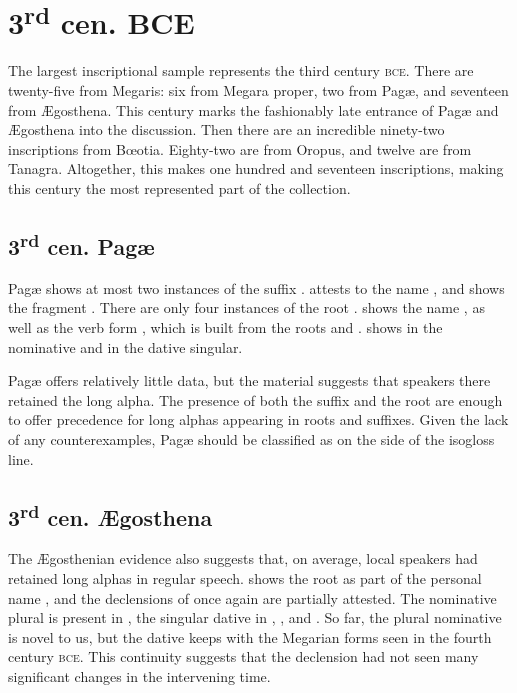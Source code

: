\section{3\textsuperscript{rd} cen.  BCE}

The largest inscriptional sample represents the third century \textsc{bce}.
There are twenty-five from Megaris:
six from Megara proper,
two from Pagæ,
and seventeen from Ægosthena.
This century marks the fashionably late entrance of Pagæ and Ægosthena into the discussion.
Then there are an incredible ninety-two inscriptions from Bœotia.
Eighty-two are from Oropus,
and twelve are from Tanagra.
Altogether,
this makes one hundred and seventeen inscriptions,
making this century the most represented part of the collection.

\subsection{3\textsuperscript{rd} cen.  Pagæ}
Pagæ shows at most two instances of the suffix .
 attests to the name ,
and  shows the fragment .
There are only four instances of the root .
 shows the name ,
as well as the verb form ,
which is built from the roots  and .
 shows  in the nominative and  in the dative singular.

Pagæ offers relatively little data,
but the material suggests that speakers there retained the long alpha. 
The presence of both the suffix 
and the root  are enough to offer precedence for long alphas appearing in roots and suffixes.
Given the lack of any counterexamples,
Pagæ should be classified as on the  side of the isogloss line.

\subsection{3\textsuperscript{rd} cen.  Ægosthena}
The Ægosthenian evidence also suggests that,
on average,
local speakers had retained long alphas in regular speech.
 shows the root  as part of the personal name ,
and the declensions of  once again are partially attested.
The nominative plural  is present in ,
the singular dative  in ,
,
and .
So far,
the plural nominative is novel to us,
but the dative keeps with the Megarian forms seen in the fourth century \textsc{bce}.
This continuity suggests that the declension had not seen many significant changes in the intervening time.

